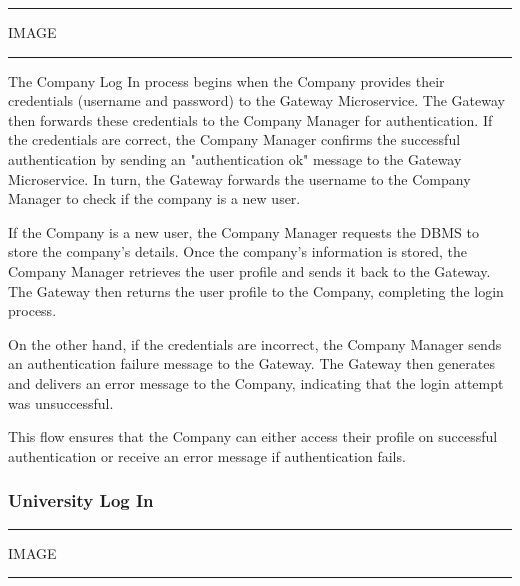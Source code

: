 \vspace{20pt}
\hrule
\vspace{10pt}
IMAGE
\vspace{10pt}
\hrule
\vspace{20pt}

The Company Log In process begins when the Company provides their credentials (username and password) to the Gateway Microservice. The Gateway then forwards these credentials to the Company Manager for authentication. If the credentials are correct, the Company Manager confirms the successful authentication by sending an "authentication ok" message to the Gateway Microservice. In turn, the Gateway forwards the username to the Company Manager to check if the company is a new user.

If the Company is a new user, the Company Manager requests the DBMS to store the company’s details. Once the company’s information is stored, the Company Manager retrieves the user profile and sends it back to the Gateway. The Gateway then returns the user profile to the Company, completing the login process.

On the other hand, if the credentials are incorrect, the Company Manager sends an authentication failure message to the Gateway. The Gateway then generates and delivers an error message to the Company, indicating that the login attempt was unsuccessful.

This flow ensures that the Company can either access their profile on successful authentication or receive an error message if authentication fails.

\subsubsection{University Log In}

\vspace{20pt}
\hrule
\vspace{10pt}
IMAGE
\vspace{10pt}
\hrule
\vspace{20pt}

